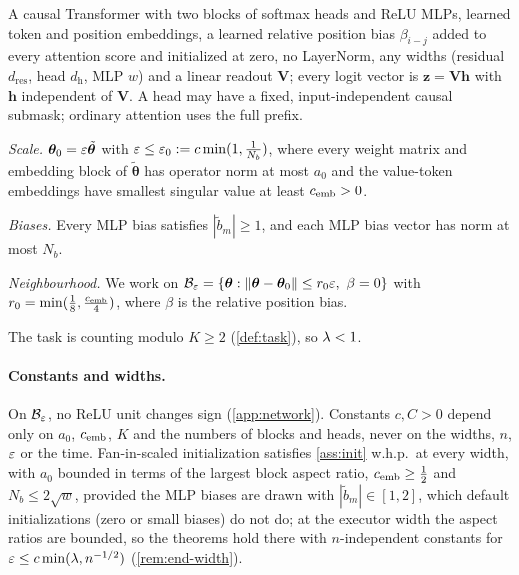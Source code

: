 \begin{assumption}[Architecture]
\label{ass:arch}
A causal Transformer with two blocks of softmax heads and ReLU MLPs, learned token and position
embeddings, a learned relative position bias $\beta_{i-j}$ added to every attention score and initialized at zero, no
LayerNorm, any widths (residual $d_{\mathrm{res}}$, head $d_{\mathrm h}$, MLP $w$) and a linear readout $\mathbf V$;
every logit vector is $\bm z=\mathbf V\bm h$ with $\bm h$ independent of $\mathbf V$. A head may have a fixed, input-independent causal submask;
ordinary attention uses the full prefix.
\end{assumption}

\begin{assumption}[Initialization]
\label{ass:init}
\emph{Scale.} $\bm\theta_0=\varepsilon\tilde{\bm\theta}$ with $\varepsilon\le\varepsilon_0:=c\min(1,\frac{1}{N_b})$, where every weight matrix and embedding block of $\tilde{\bm\theta}$ has operator norm
at most $a_0$ and the value-token embeddings have smallest singular value at least $c_{\mathrm{emb}}>0$.

\emph{Biases.} Every MLP bias satisfies $|\tilde b_m|\ge1$, and each MLP bias vector has norm at most $N_b$.

\emph{Neighbourhood.} We work on
$\initball=\{\bm\theta:\|\bm\theta-\bm\theta_0\|\le\ballradius\initscale,\ \beta=0\}$ with $r_0=\min(\frac{1}{8},\frac{c_{\mathrm{emb}}}{4})$, where $\beta$ is the
relative position bias.
\end{assumption}

\begin{assumption}[Task]
\label{ass:task}
The task is counting modulo $K\ge2$ (\cref{def:task}), so $\lambda<1$.
\end{assumption}

\paragraph{Constants and widths.} On $\mathcal B_{\varepsilon}$, no ReLU unit changes sign (\cref{app:network}). Constants $c,C>0$ depend only on $a_0$, $c_{\mathrm{emb}}$, $K$
and the numbers of blocks and heads, never on the widths, $n$, $\varepsilon$ or the time. Fan-in-scaled initialization
satisfies \cref{ass:init} w.h.p.\ at every width, with $a_0$ bounded in terms of the largest block aspect ratio,
$\embconst\ge\tfrac{1}{2}$ and $N_b\le2\sqrt w$, provided the MLP biases are drawn with $|\tilde b_m|\in[1,2]$, which default
initializations (zero or small biases) do not do; at the executor width the aspect ratios are bounded, so the theorems
hold there with $n$-independent constants for $\varepsilon\le c\min(\lambda,n^{-1/2})$ (\cref{rem:end-width}).

